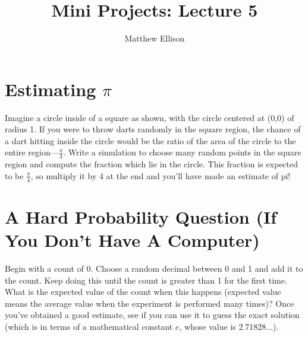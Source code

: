 \documentclass{hitec}
\title{Mini Projects: Lecture 5}
\author{Matthew Ellison}
\begin{document}
\maketitle


\section{Estimating $\pi$}
Imagine a circle inside of a square as shown, with the circle centered at (0,0) of radius 1. If you were to throw darts randomly in the square region, the chance of a dart hitting inside the circle would be the ratio of the area of the circle to the entire region---$\frac{\pi}{4}$.
Write a simulation to choose many random points in the square region and compute the fraction which lie in the circle. This fraction is expected to be $\frac{\pi}{4}$, so multiply it by 4 at the end and you'll have made an estimate of pi!


\begin{center}

\end{center}

\section{A Hard Probability Question (If You Don't Have A Computer)}
Begin with a count of 0. Choose a random decimal between 0 and 1 and add it to the count. Keep doing this until the count is greater than 1 for the first time. What is the expected value of the count when this happens (expected value means the average value when the experiment is performed many times)? Once you've obtained a good estimate, see if you can use it to guess the exact solution (which is in terms of a mathematical constant $e$, whose value is 2.71828...).
\end{document}
